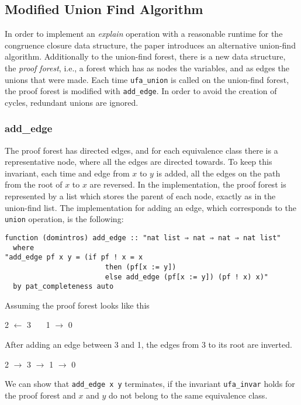 \subsection{Modified Union Find Algorithm}

In order to implement an \emph{explain} operation with a reasonable runtime for the congruence closure data structure, the paper \cite{Nieuwenhuis} introduces an alternative union-find algorithm. Additionally to the union-find forest, there is a new data structure, the \emph{proof forest}, i.e., a forest which has as nodes the variables, and as edges the unions that were made. Each time \lstinline{ufa_union} is called on the union-find forest, the proof forest is modified with \lstinline{add_edge}. In order to avoid the creation of cycles, redundant unions are ignored.

\subsubsection{add\_edge}
\label{subsubsection:addedge}

The proof forest has directed edges, and for each equivalence class there is a representative node, where all the edges are directed towards. To keep this invariant, each time and edge from $x$ to $y$ is added, all the edges on the path from the root of $x$ to $x$ are reversed.
In the implementation, the proof forest is represented by a list which stores the parent of each node, exactly as in the union-find list. The implementation for adding an edge, which corresponds to the \lstinline{union} operation, is the following:

\begin{lstlisting}
function (domintros) add_edge :: "nat list ⇒ nat ⇒ nat ⇒ nat list"
  where
"add_edge pf x y = (if pf ! x = x
                        then (pf[x := y])
                        else add_edge (pf[x := y]) (pf ! x) x)"
  by pat_completeness auto
\end{lstlisting}

\begin{exmp}
Assuming the proof forest looks like this

2 $\longleftarrow$ 3 \ \ \ 1 $\longrightarrow$ 0 \

After adding an edge between 3 and 1, the edges from 3 to its root are inverted.

2 $\longrightarrow$ 3 $\longrightarrow$ 1 $\longrightarrow$ 0 \
\end{exmp}

We can show that \lstinline{add_edge x y} terminates, if the invariant \lstinline{ufa_invar} holds for the proof forest and $x$ and $y$ do not belong to the same equivalence class.

